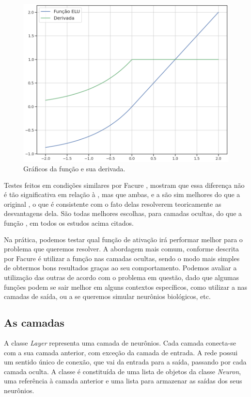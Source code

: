 \begin{figure}[htb]
\centering
\includegraphics[width=12cm]{figuras/elu}
\caption{Gráficos da função  e sua derivada.}
\label{fig:elu}
\end{figure}

Testes feitos em condições similares por Facure \citep{matheus}, mostram que essa diferença não é tão significativa em relação à , mas que ambas,  e a  são sim melhores do que a original , o que é consistente com o fato delas resolverem teoricamente as desvantagens dela. São todas melhores escolhas, para camadas ocultas, do que a função , em todos os estudos acima citados.

Na prática, podemos testar qual função de ativação irá performar melhor para o problema que queremos resolver. A abordagem mais comum, conforme descrita por Facure \citep{matheus} é utilizar a função  nas camadas ocultas, sendo o modo mais simples de obtermos bons resultados graças ao seu comportamento. Podemos avaliar a utilização das outras de acordo com o problema em questão, dado que algumas funções podem se sair melhor em alguns contextos específicos, como utilizar a  nas camadas de saída, ou a  se queremos simular neurônios biológicos, etc.

\subsection{As camadas}

A classe \emph{Layer} representa uma camada de neurônios. Cada camada conecta-se com a sua camada anterior, com exceção da camada de entrada. A rede  possui um sentido único de conexão, que vai da entrada para a saída, passando por cada camada oculta. A classe é constituída de uma lista de objetos da classe \emph{Neuron}, uma referência à camada anterior e uma lista para armazenar as saídas dos seus neurônios.

